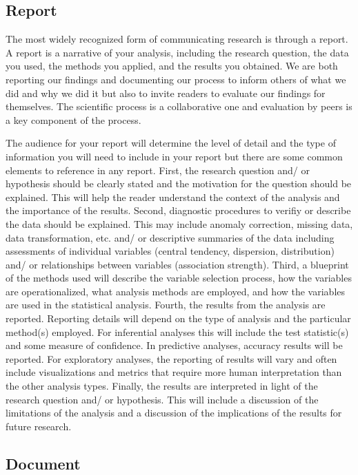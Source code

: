 \documentclass[
  letterpaper,
  DIV=11,
  numbers=noendperiod]{scrreport}
\theoremstyle{definition}
\theoremstyle{remark}
\begin{document}
\hypertarget{sec-aa-report}{%
\subsection{Report}\label{sec-aa-report}}

The most widely recognized form of communicating research is through a
report. A report is a narrative of your analysis, including the research
question, the data you used, the methods you applied, and the results
you obtained. We are both reporting our findings and documenting our
process to inform others of what we did and why we did it but also to
invite readers to evaluate our findings for themselves. The scientific
process is a collaborative one and evaluation by peers is a key
component of the process.

The audience for your report will determine the level of detail and the
type of information you will need to include in your report but there
are some common elements to reference in any report. First, the research
question and/ or hypothesis should be clearly stated and the motivation
for the question should be explained. This will help the reader
understand the context of the analysis and the importance of the
results. Second, diagnostic procedures to verifiy or describe the data
should be explained. This may include anomaly correction, missing data,
data transformation, etc. and/ or descriptive summaries of the data
including assessments of individual variables (central tendency,
dispersion, distribution) and/ or relationships between variables
(association strength). Third, a blueprint of the methods used will
describe the variable selection process, how the variables are
operationalized, what analysis methods are employed, and how the
variables are used in the statistical analysis. Fourth, the results from
the analysis are reported. Reporting details will depend on the type of
analysis and the particular method(s) employed. For inferential analyses
this will include the test statistic(s) and some measure of confidence.
In predictive analyses, accuracy results will be reported. For
exploratory analyses, the reporting of results will vary and often
include visualizations and metrics that require more human
interpretation than the other analysis types. Finally, the results are
interpreted in light of the research question and/ or hypothesis. This
will include a discussion of the limitations of the analysis and a
discussion of the implications of the results for future research.

\hypertarget{sec-aa-document}{%
\subsection{Document}\label{sec-aa-document}}
\end{document}
